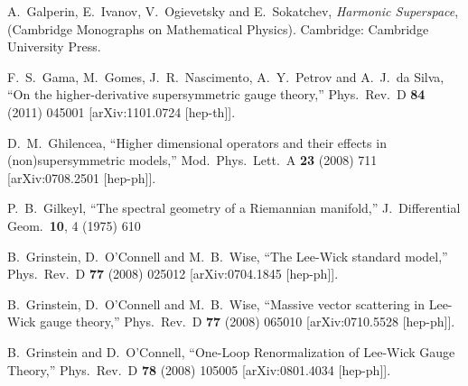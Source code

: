 \begin{thebibliography}{99}
  
  A.~Galperin, E.~Ivanov, V.~Ogievetsky and E.~Sokatchev,
  \emph{Harmonic Superspace},
   (Cambridge Monographs on Mathematical Physics). Cambridge: Cambridge University Press.%
 
 
 

  F.~S.~Gama, M.~Gomes, J.~R.~Nascimento, A.~Y.~Petrov and A.~J.~da Silva,
  ``On the higher-derivative supersymmetric gauge theory,''
  Phys.\ Rev.\ D {\bf 84} (2011) 045001
  [arXiv:1101.0724 [hep-th]].
 

    
  D.~M.~Ghilencea,
  ``Higher dimensional operators and their effects in (non)supersymmetric models,''
  Mod.\ Phys.\ Lett.\ A {\bf 23} (2008) 711
  [arXiv:0708.2501 [hep-ph]].
  
  P.~B.~Gilkeyl,
  ``The spectral geometry of a Riemannian manifold,''
  J.\ Differential Geom.\ {\bf 10}, 4 (1975) 610

  
  B.~Grinstein, D.~O'Connell and M.~B.~Wise,
  ``The Lee-Wick standard model,''
  Phys.\ Rev.\ D {\bf 77} (2008) 025012
  [arXiv:0704.1845 [hep-ph]].
  
  
  B.~Grinstein, D.~O'Connell and M.~B.~Wise,
  ``Massive vector scattering in Lee-Wick gauge theory,''
  Phys.\ Rev.\ D {\bf 77} (2008) 065010
  [arXiv:0710.5528 [hep-ph]].
  
  
  B.~Grinstein and D.~O'Connell,
  ``One-Loop Renormalization of Lee-Wick Gauge Theory,''
  Phys.\ Rev.\ D {\bf 78} (2008) 105005
  [arXiv:0801.4034 [hep-ph]].
  

\end{thebibliography}
